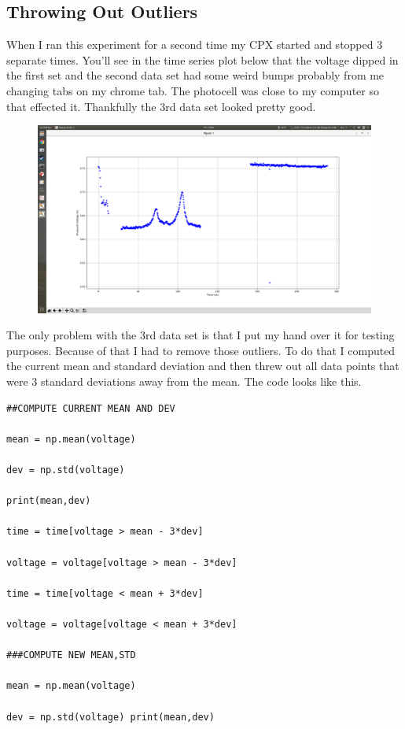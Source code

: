 \subsection{Throwing Out Outliers}
When I ran this experiment for a second time my CPX started and stopped 3 separate times. You'll see in the time series plot below that the voltage dipped in the first set and the second data set had some weird bumps probably from me changing tabs on my chrome tab. The photocell was close to my computer so that effected it. Thankfully the 3rd data set looked pretty good.
\begin{figure}[H]
  \begin{center}
    \includegraphics[width=\textwidth]{Figures/photocell_bad.png}
  \end{center}
\end{figure}
The only problem with the 3rd data set is that I put my hand over it for testing purposes. Because of that I had to remove those outliers. To do that I computed the current mean and standard deviation and then threw out all data points that were 3 standard deviations away from the mean. The code looks like this.
\begin{verbatim}
##COMPUTE CURRENT MEAN AND DEV 

mean = np.mean(voltage) 

dev = np.std(voltage) 

print(mean,dev) 

time = time[voltage > mean - 3*dev]

voltage = voltage[voltage > mean - 3*dev] 

time = time[voltage < mean + 3*dev] 

voltage = voltage[voltage < mean + 3*dev]

###COMPUTE NEW MEAN,STD 

mean = np.mean(voltage) 

dev = np.std(voltage) print(mean,dev)
\end{verbatim}

